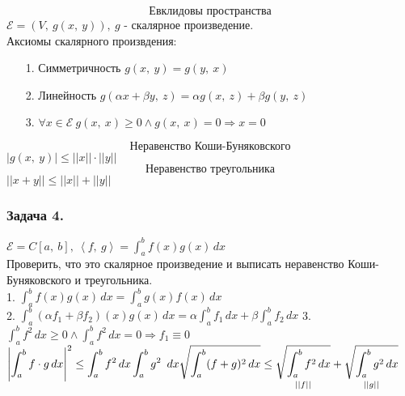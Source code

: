 \documentclass[12pt, letterpaper, twoside]{article}
\newcommand{\DS}{\displaystyle}
\begin{document}
        \[\text{Евклидовы пространства}\]
        $\mathcal{E} = (V,\ g(x,\ y)),\ g$ - скалярное произведение.\\
        Аксиомы скалярного произвдения:
        \begin{enumerate}
            \item[1.] Симметричность $g(x,\ y) = g(y,\ x)$
            \item[2.] Линейность $g(\alpha x + \beta y,\ z) = \alpha g(x,\ z) + \beta g(y,\ z)$
            \item[3.] $\forall x\in \mathcal{E}\ g(x,\ x) \geq 0\wedge g(x,\ x) = 0\Rightarrow x = 0$ 
        \end{enumerate}
        \[\text{Неравенство Коши-Буняковского}\]
        $|g(x,\ y)| \leq ||x||\cdot ||y||$
        \[\text{Неравенство треугольника}\]
        $||x + y|| \leq ||x|| + ||y||$
        \subsubsection*{Задача 4.}
        $\mathcal{E} = C[a,\ b],\ \left< f,\ g\right> = \DS\int_a^b f(x) g(x)\, dx$\\
        Проверить, что это скалярное произведение и выписать неравенство Коши-Буняковского и треугольника.\\
        1. $\DS \int_a^b f(x) g(x)\, dx = \int_a^b g(x) f(x)\, dx$\\
        2. $\DS \int_a^b (\alpha f_1 + \beta f_2)(x)g(x)\, dx = \alpha\int_a^b f_1 \, dx  + \beta \int_a^b f_2\, dx$
        3. $\DS\int_a^b f^2\, dx \geq 0\wedge \int_a^b f^2\, dx = 0\Rightarrow f_1 \equiv 0$\\
        $\left| \DS\int_a^b f\cdot g\, dx \right|^2 \leq \DS\int_a^b f^2\, dx \int_a^b g^2\,\ dx\\
        \sqrt{\int_a^b (f + g)^2\, dx} \leq \underset{||f||}{\sqrt{\int_a^b f^2\, dx}} + \underset{||g||}{\sqrt{\int_a^b g^2\, dx}}$
\end{document}
